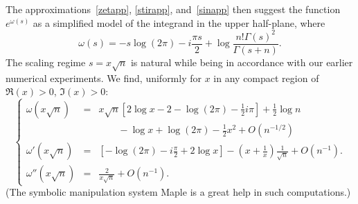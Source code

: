 \documentclass{amsart}
\def\ds{\displaystyle}
\begin{document}
The approximations~\eqref{zetapp}, \eqref{stirapp}, and~\eqref{sinapp}
then suggest the function $e^{\omega(s)}$
 as a simplified model of the integrand in the upper half-plane, where
\begin{equation}\label{omdef}
\omega(s)=-s\log(2\pi)-i\frac{\pi s}{2}+\log\frac{n! \Gamma(s)^2}{\Gamma(s+n)}.
\end{equation}
The scaling regime $s=x\sqrt{n}$ is natural while being in accordance with 
our earlier numerical experiments. 
We find, uniformly for $x$ in any compact region of $\Re(x)>0$, $\Im(x)>0$:
\begin{equation}\label{om012}
\left\{\begin{array}{lll}
\omega(x\sqrt{n})&=&\ds x\sqrt{n}\left[2\log x-2-\log(2\pi)-\frac12i\pi \right]+\frac12\log n
\\
&&\ds \qquad -\log x +\log(2\pi)-\frac12x^2+O(n^{-1/2})
\\
\omega'(x\sqrt{n})&=& \ds \left[-\log(2\pi) -i\frac{\pi}{2}+2\log x\right]
-\left(x+\frac1x\right)\frac{1}{\sqrt{n}}+O(n^{-1}).
\\
\omega''(x\sqrt{n})&=&\ds \frac{2}{x\sqrt{n}}+O(n^{-1}).
\end{array}\right. 
\end{equation}
(The symbolic manipulation system {\sc Maple} is a great help in such computations.)
\end{document}
